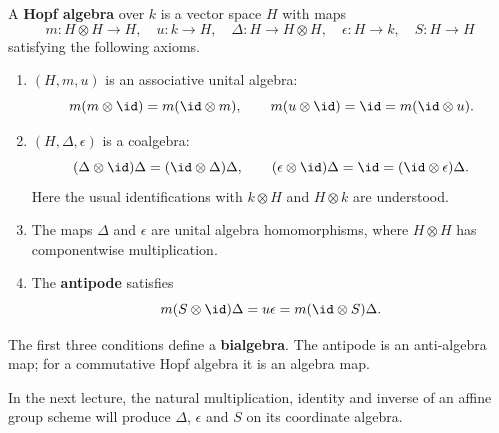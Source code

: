 \begin{definition}
A \textbf{Hopf algebra} over $k$ is a vector space $H$ with maps
\[
 m:H\otimes H\to H,\quad u:k\to H,\quad
 \Delta:H\to H\otimes H,\quad \epsilon:H\to k,\quad S:H\to H
\]
satisfying the following axioms.
\begin{enumerate}
\item $(H,m,u)$ is an associative unital algebra:
\[
 m(m\otimes\id)=m(\id\otimes m),\qquad
 m(u\otimes\id)=\id=m(\id\otimes u).
\]
\item $(H,\Delta,\epsilon)$ is a coalgebra:
\[
 (\Delta\otimes\id)\Delta=(\id\otimes\Delta)\Delta,\qquad
 (\epsilon\otimes\id)\Delta=\id=(\id\otimes\epsilon)\Delta.
\]
Here the usual identifications with $k\otimes H$ and $H\otimes k$ are understood.
\item The maps $\Delta$ and $\epsilon$ are unital algebra homomorphisms,
where $H\otimes H$ has componentwise multiplication.
\item The \textbf{antipode} satisfies
\[
 m(S\otimes\id)\Delta=u\epsilon=m(\id\otimes S)\Delta.
\]
\end{enumerate}
The first three conditions define a \textbf{bialgebra}. The antipode is an
anti-algebra map; for a commutative Hopf algebra it is an algebra map.
\end{definition}

In the next lecture, the natural multiplication, identity and inverse of an
affine group scheme will produce $\Delta$, $\epsilon$ and $S$ on its coordinate
algebra.
